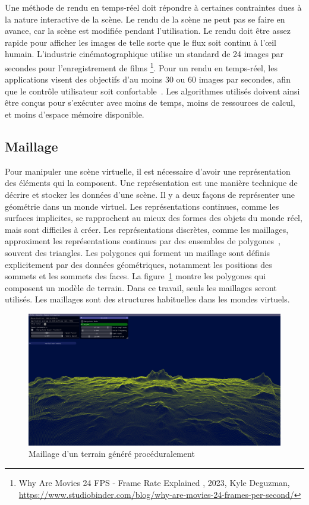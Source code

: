 Une méthode de rendu en temps-réel doit répondre à certaines contraintes dues à la nature interactive de la scène. Le rendu de la scène ne peut pas se faire en avance, car la scène est modifiée pendant l'utilisation. Le rendu doit être assez rapide pour afficher les images de telle sorte que le flux soit continu à l'œil humain. L'industrie cinématographique utilise un standard de 24 images par secondes pour l'enregistrement de films \footnote{\og Why Are Movies 24 FPS - Frame Rate Explained \fg, 2023, Kyle Deguzman, \url{https://www.studiobinder.com/blog/why-are-movies-24-frames-per-second/}}. Pour un rendu en temps-réel, les applications visent des objectifs d'au moins 30 ou 60 images par secondes, afin que le contrôle utilisateur soit confortable~\cite{janzen_is_2014}. Les algorithmes utilisés doivent ainsi être conçus pour s'exécuter avec moins de temps, moins de ressources de calcul, et moins d'espace mémoire disponible.

\subsection{Maillage}

Pour manipuler une scène virtuelle, il est nécessaire d'avoir une représentation des éléments qui la composent. Une représentation est une manière technique de décrire et stocker les données d'une scène. Il y a deux façons de représenter une géométrie dans un monde virtuel. Les représentations continues, comme les surfaces implicites, se rapprochent au mieux des formes des objets du monde réel, mais sont difficiles à créer. Les représentations discrètes, comme les maillages, approximent les représentations continues par des ensembles de polygones~\cite{coons_surfaces_1967}, souvent des triangles. Les polygones qui forment un maillage sont définis explicitement par des données géométriques, notamment les positions des sommets et les sommets des faces. La figure~\ref{fig:procedural-mesh} montre les polygones qui composent un modèle de terrain. Dans ce travail, seuls les maillages seront utilisés. Les maillages sont des structures habituelles dans les mondes virtuels.

\begin{figure}[h!]
    \centering
    \includegraphics[width=\textwidth]{contenu/resources/images/full_terrain}
    \caption{Maillage d'un terrain généré procéduralement}
    \label{fig:procedural-mesh}
\end{figure}

